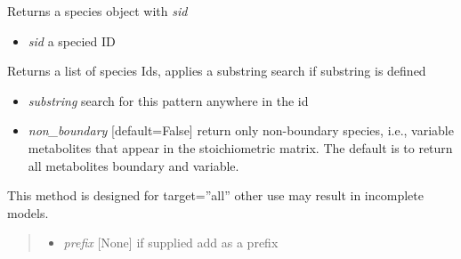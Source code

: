 \documentclass[a4paper,11pt,english]{sphinxmanual}
\begin{document}
\begin{fulllineitems}
\begin{fulllineitems}
\end{fulllineitems}


\begin{fulllineitems}
\label{modules_doc:cbmpy.CBModel.Model.getSpecies}
Returns a species object with \emph{sid}
\begin{itemize}
\item {} 
\emph{sid} a specied ID

\end{itemize}

\end{fulllineitems}


\begin{fulllineitems}
\label{modules_doc:cbmpy.CBModel.Model.getSpeciesIds}
Returns a list of species Ids, applies a substring search if substring is defined
\begin{itemize}
\item {} 
\emph{substring} search for this pattern anywhere in the id

\item {} 
\emph{non\_boundary} {[}default=False{]} return only non-boundary species, i.e., variable metabolites that appear in the stoichiometric matrix. The default is to return all metabolites boundary and variable.

\end{itemize}

\end{fulllineitems}


\begin{fulllineitems}
\label{modules_doc:cbmpy.CBModel.Model.renameObjectIds}
This method is designed for target=''all'' other use may result in incomplete models.
\begin{quote}
\begin{itemize}
\item {} 
\emph{prefix} {[}None{]} if supplied add as a prefix


\end{itemize}
\end{quote}
\end{fulllineitems}
\end{fulllineitems}
\end{document}
